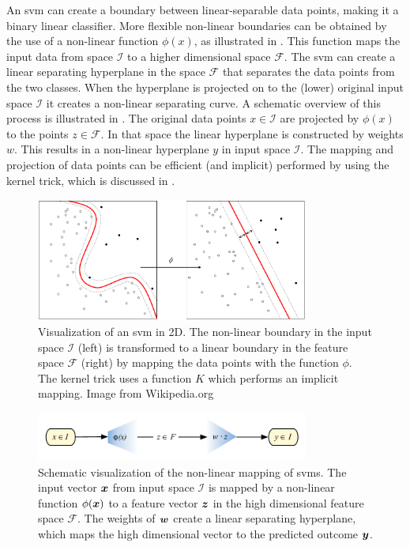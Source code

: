An \gls{svm} can create a boundary between linear-separable data points, making it a binary linear classifier.
More flexible non-linear boundaries can be obtained by the use of a non-linear function $\phi(x)$, as illustrated in .
This function maps the input data from space $\mathcal{I}$ to a higher dimensional space $\mathcal{F}$.
The \gls{svm} can create a linear separating hyperplane in the space $\mathcal{F}$ that separates the data points from the two classes.
When the hyperplane is projected on to the (lower) original input space $\mathcal{I}$ it creates a non-linear separating curve.
A schematic overview of this process is illustrated in .
The original data points $x \in \mathcal{I}$ are projected by $\phi(x)$ to the points $z \in \mathcal{F}$.
In that space the linear hyperplane is constructed by weights $w$.
This results in a non-linear hyperplane $y$ in input space $\mathcal{I}$.
The mapping and projection of data points can be efficient (and implicit) performed by using the kernel trick, which is discussed in .

\begin{figure}
\centering
  \includegraphics[width=0.8\textwidth]{./Figures/chapter3/svm_kernel_mapping.png}
  \caption[Kernel mapping]{Visualization of an \gls{svm} in 2D.
  The non-linear boundary in the input space $\mathcal{I}$ (left) is transformed to a linear boundary in the feature space $\mathcal{F}$ (right) by mapping the data points with the function $\phi$.
  The kernel trick uses a function $K$ which performs an implicit mapping. Image from Wikipedia.org}
  \label{fig:kernel_mapping}
\end{figure}

\begin{figure}
\centering
  \includegraphics[width=0.8\textwidth]{./Figures/chapter3/svm_mapping_spaces.pdf}
  \caption[Mapping spaces in \gls{svm}]{Schematic visualization of the non-linear mapping of \glspl{svm}.
  The input vector $\vectorsym{x}$ from input space $\mathcal{I}$ is mapped by a non-linear function $\phi(\vectorsym{x})$ to a feature vector $\vectorsym{z}$ in the high dimensional feature space $\mathcal{F}$.
  The weights of $\vectorsym{w}$ create a linear separating hyperplane, which maps the high dimensional vector to the predicted outcome $\vectorsym{y}$.}
  \label{fig:svm_mapping_spaces}
\end{figure}


